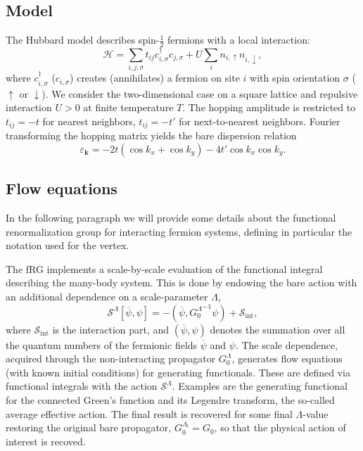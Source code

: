 
\subsection{Model}

The Hubbard model\cite{Montorsi1992} describes spin-$\frac{1}{2}$ fermions with a local interaction:
\begin{equation}
 \mathcal{H} = \sum_{i,j,\sigma} t_{ij} c^{\dagger}_{i,\sigma} c_{j,\sigma}
 + U \sum_{i} n_{i,\uparrow} n_{i,\downarrow} ,
\end{equation}
where $c^{\dagger}_{i,\sigma}$ ($c_{i,\sigma}$)  creates (annihilates) a fermion on site $i$ with spin orientation $\sigma$ ($\uparrow$ or $\downarrow$). We consider the two-dimensional case on a square lattice and repulsive interaction $U>0$ at finite temperature $T$. The hopping amplitude is restricted to $t_{ij} = -t$ for nearest neighbors, $t_{ij}=-t'$ for next-to-nearest neighbors. Fourier transforming the hopping matrix yields the bare dispersion relation
\begin{equation}
 \varepsilon_{\mathbf{k}} =
 -2t \left( \cos{k_x} + \cos{k_y} \right) -4 t' \cos{k_x} \cos{k_y} .
\end{equation}


\subsection{Flow equations}

In the following paragraph we will provide some details about the functional renormalization group for interacting fermion systems,\cite{Metzner2012,Platt2013} defining in particular the notation used for the vertex. 

The fRG implements a scale-by-scale evaluation of the functional integral describing the many-body system. 
This is done by endowing the bare action with an additional dependence on a scale-parameter $\Lambda$,
\begin{equation}
 \mathcal{S}^\Lambda[\overline\psi,\psi] =
 -(\overline\psi,{G_0^\Lambda}^{-1}\psi)+\mathcal{S}_{\mathrm{int}},  
\end{equation} 
where $\mathcal{S}_{\mathrm{int}}$ is the interaction part, and $(\overline\psi,\psi)$ denotes the summation over all the quantum numbers of the fermionic fields  $\overline \psi$ and $\psi$. 
The scale dependence, acquired through the non-interacting propagator $G_0^\Lambda$, generates flow equations (with known initial conditions) for generating functionals. These are defined via functional integrals with the action $\mathcal{S}^\Lambda$. 
Examples are the generating functional for the connected Green's function and its Legendre transform, the so-called average effective action.\cite{Wetterich1993}
The final result is recovered for some final $\Lambda$-value restoring the original bare propagator, $G_0^{\Lambda_\mathrm{f}} = G_0$, so that the physical action of interest is recoved.  

